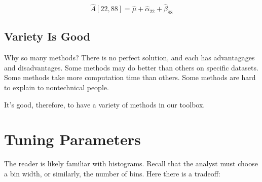 \begin{equation}
\widehat{A}[22,88] = \widehat{\mu} + \widehat{\alpha}_{22} + 
\widehat{\beta}_{88}
\end{equation}

\subsection{Variety Is Good}

Why so many methods?  There is no perfect solution, and each has
advantagages and disadvantages. 
Some methods may do better than
others on specific datasets.  Some methods take more computation time
than others.  Some methods are hard to explain to nontechnical people.

It's good, therefore, to have a variety of methods in our toolbox.

\section{Tuning Parameters}

The reader is likely familiar with histograms.  Recall that the analyst
must choose a bin width, or similarly, the number of bins.  Here there
is a tradeoff:

